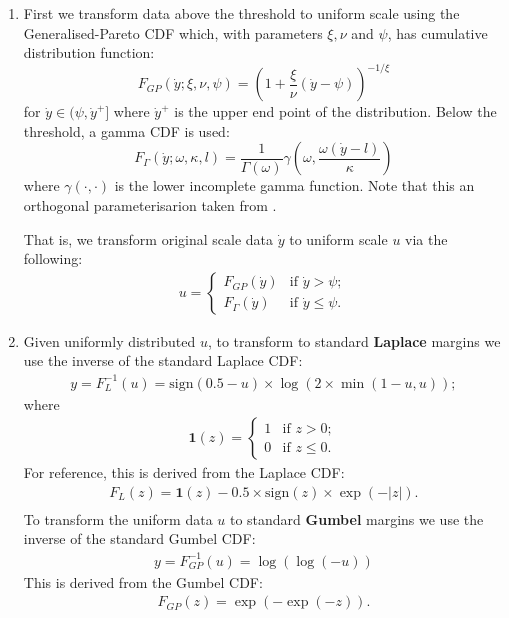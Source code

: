 \begin{enumerate}
	\item First we transform data above the threshold to uniform scale using the Generalised-Pareto CDF which, with parameters $\xi, \nu$ and $\psi$, has cumulative distribution function:
	\[F_{GP}(\dot{y};\xi,\nu,\psi) = (1+\frac{\xi}{\nu} \left(\dot{y}-\psi\right) )^{-1/\xi}\]
	for $\dot{y} \in (\psi, \dot{y}^+]$  where $\dot{y}^+$ is the upper end point of the distribution. 
	Below the threshold, a gamma CDF is used: 
	\[F_{\Gamma}(\dot{y};\omega,\kappa,l) = {\frac{1}{\Gamma(\omega)}}\gamma \left(\omega,\frac{\omega(\dot{y}-l)}{\kappa }\right) \]
	where $\gamma(\cdot,\cdot)$ is the lower incomplete gamma function. Note that this an orthogonal parameterisarion taken from \cite{Cox87}.

	That is, we transform original scale data $\dot{y}$ to uniform scale $u$ via the following:
	\begin{align*}
	u = 
	\left\{ \begin{array}{ll}
	F_{GP}(\dot{y}) & \mbox{if $\dot{y} > \psi$};\\
	F_{\Gamma}(\dot{y}) & \mbox{if $\dot{y} \leq \psi$}.
	\end{array} \right. 
	\end{align*}
	

	\item Given uniformly distributed $u$, to transform to standard \textbf{Laplace} margins we use the inverse of the standard Laplace CDF:
	\begin{align*}
	    y = F^{-1}_{L}(u)= \text{sign}(0.5-u)\times\log(2\times \min(1-u,u)); 
	\end{align*}
	where 
	\begin{align*}
		\boldsymbol{1}(z) = 
		\left\{ \begin{array}{ll}
			1 & \mbox{if $z > 0$};\\
			0 & \mbox{if $z \leq 0$}.
		\end{array} \right. 
	\end{align*}
	For reference, this is derived from the Laplace CDF: 
	\begin{align*}
			F_{L}(z) = \boldsymbol{1}(z)-0.5\times\text{sign}(z)\times\exp(-|z|).\\ 
	\end{align*}
	To transform the uniform data $u$ to standard \textbf{Gumbel} margins we use the inverse of the standard Gumbel CDF:
	\begin{align*}
		y = F^{-1}_{GP}(u)= \log(\log(-u))
	\end{align*} 
	This is derived from the Gumbel CDF: 
	\begin{align*}
		F_{GP}(z) = \exp(-\exp(-z)).\\
	\end{align*}
\end{enumerate}

